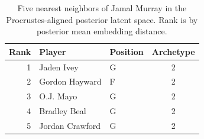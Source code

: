 \begin{table}[htbp]
  \centering\small
  \begin{tabular}{rllc}
    \toprule
    Rank & Player & Position & Archetype \\
    \midrule
    1 & Jaden Ivey & G & 2 \\
    2 & Gordon Hayward & F & 2 \\
    3 & O.J. Mayo & G & 2 \\
    4 & Bradley Beal & G & 2 \\
    5 & Jordan Crawford & G & 2 \\
    \bottomrule
  \end{tabular}
  \caption{Five nearest neighbors of Jamal Murray in the Procrustes-aligned posterior latent space. Rank is by posterior mean embedding distance.}
  \label{tab:Jamal_Murray_neighbors}
\end{table}

